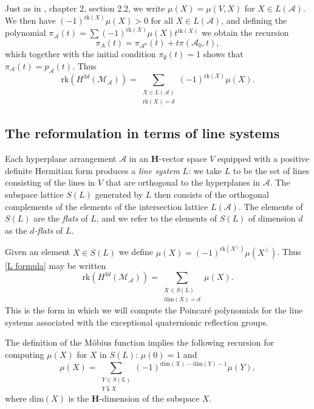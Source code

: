 \documentclass[11pt, reqno]{amsart}
\numberwithin{equation}{section}
\theoremstyle{definition}
\theoremstyle{plain}
\newcommand{\HH}{\mathbf{H}}
\newcommand{\A}{\mathcal{A}}
\newcommand{\cM}{\mathcal{M}}
\begin{document}
Just as in \cite{OrTe}, chapter 2, section 2.2, we write $\mu(X)=\mu(V,X)$ for $X \in L(\A)$. We then have $(-1)^{\mathrm{rk}(X)} \mu(X) >0$ for all $X \in L(\A)$, and defining the polynomial $\pi_\A(t)=\sum (-1)^{\mathrm{rk}(X)} \mu(X) t^{\mathrm{rk}(X)}$ we obtain the recursion
$$\pi_A(t)=\pi_{\A^0}(t)+t\pi(\A_0,t),$$ which together with the initial condition $\pi_\emptyset(t)=1$ shows that $\pi_\A(t)=p_\A(t)$. Thus
\begin{equation} \label{L formula}
\mathrm{rk}(H^{3d}(\cM_\A))=\sum_{\substack{X \in L(\A) \\ \mathrm{rk}(X)=d}} (-1)^{\mathrm{rk}(X)} \mu(X).
\end{equation} 
\subsection{The reformulation in terms of line systems}

Each hyperplane arrangement $\A$ in an $\HH$-vector space $V$ equipped with a positive definite Hermitian form produces a \emph{line system} $L$: we take $L$ to be the set of lines consisting of the lines in $V$ that are orthogonal to the hyperplanes in $\A$. The subspace lattice $S(L)$ generated by $L$ then consists of the orthogonal complements of the elements of the intersection lattice $L(\A)$. The elements of $S(L)$ are the \emph{flats} of $L$, and we refer to the elements of $S(L)$ of dimension $d$ as the \emph{$d$-flats} of $L$. 

Given an element $X \in S(L)$ we define $\mu(X)=(-1)^{\mathrm{rk}(X^\perp)} \mu(X^\perp)$. Thus \eqref{L formula} may be written
\begin{equation} \label{line system cohomology formula}
\mathrm{rk}(H^{3d}(\cM_\A))=\sum_{\substack{X \in S(L) \\ \mathrm{dim}(X)=d}} \mu(X).
\end{equation} This is the form in which we will compute the Poincar\'e polynomials for the line systems associated with the exceptional quaternionic reflection groups. 

The definition of the M\"obius function implies the following recursion for computing $\mu(X)$ for $X$ in $S(L)$: $\mu(0)=1$ and
\begin{equation} \label{mu recursion} 
\mu(X)=\sum_{\substack{Y \in S(L) \\ Y \subsetneqq X}} (-1)^{\mathrm{dim}(X)-\mathrm{dim}(Y)-1} \mu(Y),
\end{equation} where $\mathrm{dim}(X)$ is the $\HH$-dimension of the subspace $X$.
\end{document}
